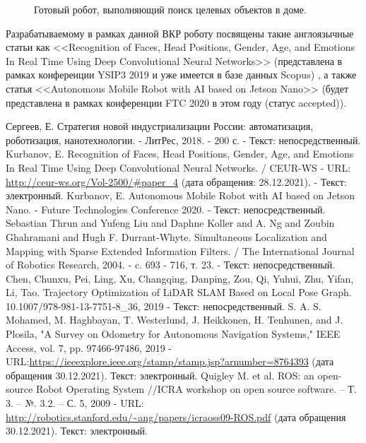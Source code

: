\documentclass[12pt,a4paper]{scrartcl}
\begin{document}
\begin{figure}[ht]
\begin{minipage}[b][][b]{0.32\linewidth}
  				 \end{minipage}
 				 \caption{Готовый робот, выполняющий поиск целевых объектов в доме.}
				  \label{fig:robot-complete}
			\end{figure}
			
			Разрабатываемому в рамках данной ВКР роботу посвящены такие англоязычные статьи как <<Recognition of Faces, Head Positions, Gender, Age, and Emotions In Real Time Using Deep Convolutional Neural Networks>> (представлена в рамках конференции YSIP3 2019 и уже имеется в базе данных Scopus) \cite{bib:YSIP-32019}, а также статья <<Autonomous Mobile Robot with AI based on Jetson Nano>> (будет представлена в рамках конференции FTC 2020 в этом году (статус accepted))\cite{bib:FTC2020}.
	
		\newpage

	\begin{thebibliography}{5}
		 Сергеев, Е. Стратегия новой индустриализации России: автоматизация, роботизация, нанотехнологии. - ЛитРес, 2018. - 200 с. - Текст: непосредственный.
		 Kurbanov, E. Recognition of Faces, Head Positions, Gender, Age, and Emotions In Real Time Using Deep Convolutional Neural Networks. / CEUR-WS - URL: \url{http://ceur-ws.org/Vol-2500/#paper_4} (дата обращения: 28.12.2021). - Текст: электронный.
		 Kurbanov, E. Autonomous Mobile Robot with AI based on Jetson Nano. - Future Technologies Conference 2020. - Текст: непосредственный.
		 Sebastian Thrun and Yufeng Liu and Daphne Koller and A. Ng and Zoubin Ghahramani and Hugh F. Durrant-Whyte. Simultaneous Localization and Mapping with Sparse Extended Information Filters. / The International Journal of Robotics Research, 2004. - c. 693 - 716, т. 23. - Текст: непосредственный.
		 Chen, Chunxu, Pei, Ling, Xu, Changqing, Danping, Zou, Qi, Yuhui, Zhu, Yifan, Li, Tao. Trajectory Optimization of LiDAR SLAM Based on Local Pose Graph. 10.1007/978-981-13-7751-8\_36, 2019 - Текст: непосредственный.
		 S. A. S. Mohamed, M. Haghbayan, T. Westerlund, J. Heikkonen, H. Tenhunen, and J. Plosila, "A Survey on Odometry for Autonomous Navigation Systems," IEEE Access, vol. 7, pp. 97466-97486, 2019 - URL:\url{https://ieeexplore.ieee.org/stamp/stamp.jsp?arnumber=8764393} (дата обращения 30.12.2021). Текст: электронный.
		 Quigley M. et al. ROS: an open-source Robot Operating System //ICRA workshop on open source software. – Т. 3. – №. 3.2. – С. 5, 2009 - URL: \url{http://robotics.stanford.edu/~ang/papers/icraoss09-ROS.pdf} (дата обращения 30.12.2021). Текст: электронный.

\end{thebibliography}
\end{document}
